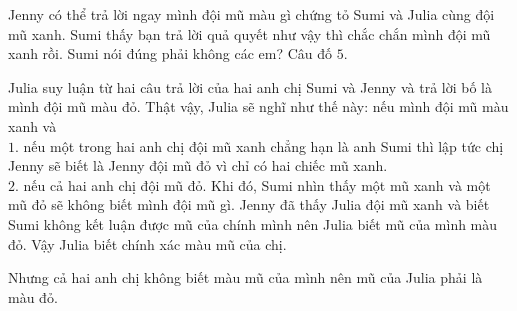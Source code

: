 Jenny có thể trả lời ngay mình đội mũ màu gì chứng tỏ Sumi và Julia cùng đội mũ xanh. Sumi thấy bạn trả lời quả quyết như vậy thì chắc chắn mình đội mũ xanh rồi. Sumi nói đúng phải không các em?
\vskip 0.1cm
Câu đố $5$. %

Julia suy luận từ hai câu trả lời của hai anh chị Sumi và Jenny và trả lời bố là mình đội mũ màu đỏ. Thật vậy, Julia sẽ nghĩ như thế này: nếu mình đội mũ màu xanh và \\
$1.$ nếu một trong hai anh chị đội mũ xanh chẳng hạn là anh Sumi thì lập tức chị Jenny sẽ biết là Jenny đội mũ đỏ vì chỉ có hai chiếc mũ xanh.\\
$2.$  nếu cả hai anh chị đội mũ đỏ. Khi đó, Sumi nhìn thấy một mũ xanh và một mũ đỏ sẽ không biết mình đội mũ gì. Jenny đã thấy Julia đội mũ xanh và biết Sumi không kết luận được mũ của chính mình nên Julia biết mũ của mình màu đỏ. Vậy Julia biết chính xác màu mũ của chị.

Nhưng cả hai anh chị không biết màu mũ của mình nên mũ của Julia phải là màu đỏ.

